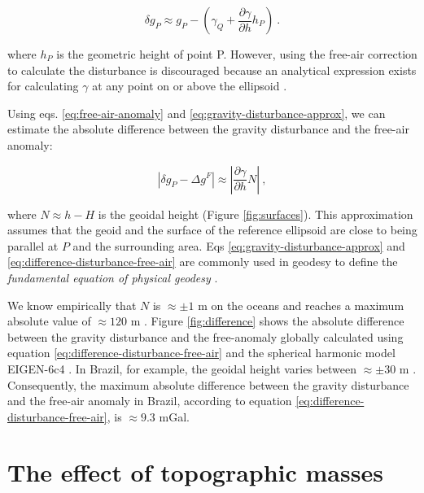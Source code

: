\documentclass[paper,twocolumn,twoside]{geophysics}
\begin{document}
\begin{equation}
\delta g_{P} \approx g_{P} -
\left( \gamma_{Q} + \frac{\partial \gamma}{\partial h} h_P \right) \: .
\label{eq:gravity-disturbance-approx}
\end{equation}

\noindent
where $h_P$ is the geometric height of point P.
However, using the free-air correction to calculate the disturbance is
discouraged because an analytical expression exists for calculating $\gamma$ at
any point on or above the ellipsoid \citep{li2001}.

Using eqs. \ref{eq:free-air-anomaly} and \ref{eq:gravity-disturbance-approx},
we can estimate the absolute difference between the gravity disturbance and the
free-air anomaly:

\begin{equation}
\left\vert \delta g_{P} - \Delta g^{F} \right\vert \approx
\left\vert \frac{\partial \gamma}{\partial h} N \right\vert \: ,
\label{eq:difference-disturbance-free-air}
\end{equation}

\noindent
where $N \approx h - H$ is the geoidal height (Figure \ref{fig:surfaces}).
This approximation assumes that the geoid and the surface of
the reference ellipsoid are close to being parallel at $P$
and the surrounding area.
Eqs \ref{eq:gravity-disturbance-approx}
and \ref{eq:difference-disturbance-free-air} are commonly used
in geodesy to define the \textit{fundamental equation of physical
	geodesy} \citep{hofmann-wellenhof-moritz2005}.

We know empirically that $N$ is $\approx \pm 1$ m on the oceans
and reaches a maximum absolute value of $\approx 120$ m
\citep[e.g.,][]{torge2012, sanso_sideris2013}.
Figure \ref{fig:difference} shows the absolute difference between the
gravity disturbance and the free-anomaly globally calculated
using equation \ref{eq:difference-disturbance-free-air} and the spherical harmonic
model EIGEN-6c4 \citep{forste2014}.
In Brazil, for example, the geoidal height
varies between $\approx \pm 30$ m \citep{ibge_mapgeo2015}.
Consequently,
the maximum absolute difference between the gravity disturbance and
the free-air anomaly in Brazil,
according to equation \ref{eq:difference-disturbance-free-air},
is $\approx 9.3$ mGal.


\section{The effect of topographic masses}
\end{document}
